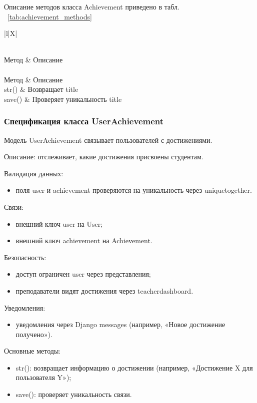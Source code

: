 Описание методов класса Achievement приведено в табл. ~\ref {tab:achievement_methods}

\begin{xltabular}{\textwidth}{|l|X|}
	\caption{Методы класса Achievement\label{tab:achievement_methods}}\\
	\hline
	Метод & Описание \\ \hline
	\endfirsthead
	\\
	\hline
	Метод & Описание \\ \hline
	\endhead
	str() & Возвращает title \\ \hline
	save() & Проверяет уникальность title \\ \hline
\end{xltabular}

\subsubsection{Спецификация класса UserAchievement}

Модель UserAchievement связывает пользователей с достижениями.


Описание: отслеживает, какие достижения присвоены студентам.

Валидация данных:
	\begin{itemize}
		\item поля user и achievement проверяются на уникальность через uniquetogether.
	\end{itemize}
	
Связи:
	\begin{itemize}
		\item внешний ключ user на User;
		\item внешний ключ achievement на Achievement.
	\end{itemize}
	
Безопасность:
	\begin{itemize}
		\item доступ ограничен user через представления;
		\item преподаватели видят достижения через teacherdashboard.
	\end{itemize}
	
Уведомления:
	\begin{itemize}
		\item уведомления через Django messages (например, «Новое достижение получено»).
	\end{itemize}
	
Основные методы:
	\begin{itemize}
		\item str(): возвращает информацию о достижении (например, «Достижение X для пользователя Y»);
		\item save(): проверяет уникальность связи.
	\end{itemize}
	
